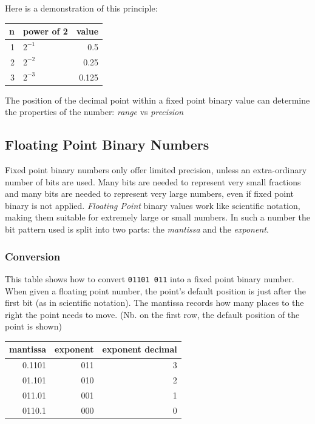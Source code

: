 \documentclass[9pt]{article}
\begin{document}
Here is a demonstration of this principle:

\begin{center}
\begin{tabular}{rlr}
\hline
n & power of 2 & value\\
\hline
1 & \(2^{-1}\) & 0.5\\
2 & \(2^{-2}\) & 0.25\\
3 & \(2^{-3}\) & 0.125\\
\hline
\end{tabular}
\end{center}

The position of the decimal point within a fixed point binary value can determine the properties of the number: \emph{range} vs \emph{precision}

\subsection{Floating Point Binary Numbers}
\label{sec:org2f57923}

Fixed point binary numbers only offer limited precision, unless an extra-ordinary number of bits are used. Many bits are needed to represent very small fractions and many bits are needed to represent very large numbers, even if fixed point binary is not applied. \emph{Floating Point} binary values work like scientific notation, making them suitable for extremely large or small numbers. In such a number the bit pattern used is split into two parts: the \emph{mantissa} and the \emph{exponent}.

\subsubsection{Conversion}
\label{sec:org7151a78}

This table shows how to convert \texttt{01101 011} into a fixed point binary number. When given a floating point number, the point's default position is just after the first bit (as in scientific notation). The mantissa records how many places to the right the point needs to move. (Nb. on the first row, the default position of the point is shown)

\begin{center}
\begin{tabular}{rrr}
\hline
mantissa & exponent & exponent decimal\\
\hline
0.1101 & 011 & 3\\
01.101 & 010 & 2\\
011.01 & 001 & 1\\
0110.1 & 000 & 0\\
\hline
\end{tabular}
\end{center}
\end{document}
